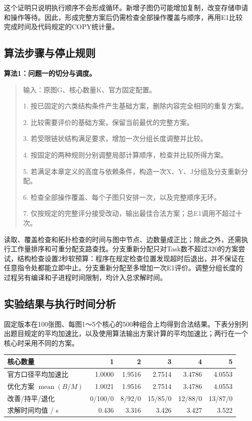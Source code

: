 \documentclass[anonymous,notoc]{gmcm2026}
\begin{document}
这个证明只说明执行顺序不会形成循环。新增子图仍可能增加复制，改变存储申请和操作等待。因此，形成完整方案后仍需检查全部操作覆盖与顺序，再用E1比较完成时间及代码规定的COPY统计量。

\subsection{算法步骤与停止规则}

\textbf{算法1：问题一的切分与调度。}

\begin{quote}
输入：原图G、核心数量K、官方固定配置。

1. 按已固定的六类结构条件产生基础方案，删除内容完全相同的重复方案。

2. 比较需要评价的基础方案，保留当前最优的完整方案。

3. 若受限链状结构满足要求，增加一次分组长度调整并比较。

4. 按固定的两种规则分别调整局部计算顺序，检查并比较所得方案。

5. 若满足本章定义的高度与依赖条件，构造一次X、Y、J分组及分支重新分配。

6. 检查全部操作覆盖、每个子图只安排一次，以及完整顺序无环。

7. 仅按规定的完整评分接受改动，输出最佳合法方案；总E1调用不超过十次。
\end{quote}

读取、覆盖检查和拓扑检查的时间与图中节点、边数量成正比；除此之外，还需执行工作量排序和可重分配支路查找。分支重新分配只对Task数不超过320的方案尝试，结构检查设置2秒软预算：程序在规定检查位置发现超时后退出，并不保证在任意指令处都能立即中止。分支重新分配至多增加一次E1评价。调整分组长度的过程另有编译和子进程时间限制，均计入总求解时间。

\subsection{实验结果与执行时间分析}

固定版本在100张图、每图1～5个核心的500种组合上均得到合法结果。下表分别列出题目规定的平均加速比，以及使用算法输出方案计算的平均加速比；两行在一个核心时采用不同的方案。

\begin{table}[!htbp]\centering\small
\begin{tabularx}{\linewidth}{@{}Xrrrrr@{}}\toprule
核心数量 & 1 & 2 & 3 & 4 & 5 \\
\midrule
官方口径平均加速比 & 1.0000 & 1.9516 & 2.7514 & 3.4786 & 4.0553 \\
优化方案 $\operatorname{mean}(B/M)$ & 1.0021 & 1.9516 & 2.7514 & 3.4786 & 4.0553 \\
改善/持平/退化 & 0/100/0 & 8/92/0 & 15/85/0 & 12/88/0 & 13/87/0 \\
求解时间均值 / s & 0.436 & 3.316 & 3.426 & 3.427 & 3.522 \\
\bottomrule\end{tabularx}\end{table}
\end{document}
